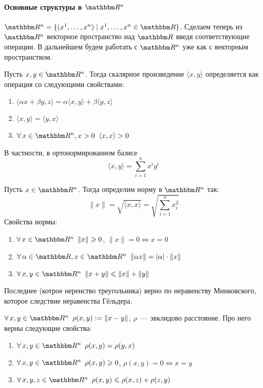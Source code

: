 \documentclass[12pt]{../../notes}
\begin{document}
\paragraph{Основные структуры в \texorpdfstring{$\R^n$}{R\^{}n}}

\begin{defn}\label{defn:Rn}
  $\R^n = \{ (x^1, \dotsc, x^n) \mid x^1, \dotsc, x^n \in \R \}$. Сделаем теперь из $\R^n$ векторное пространство
  над $\R$
  введя соответствующие операции. В дальнейшем будем работать с $\R^n$ уже как с векторным пространством.
\end{defn}

\begin{defn}\label{defn:scalprodRn}
  Пусть $x, y\in \R^n$. Тогда скалярное произведение $\langle x,y\rangle$ определяется как
  операция со следующими свойствами:
  \begin{enumerate}
    \item $\langle \alpha x + \beta y , z \rangle = \alpha \langle x,y\rangle + \beta \langle y,z\rangle$
    \item $\langle x , y \rangle = \langle y, x\rangle$
    \item $\forall\, x \in \R^n, x > 0 \;\; \langle x , x \rangle > 0$
  \end{enumerate}
  В частности, в ортонормированном базисе 
  \[
    \langle x, y \rangle = \sum_{i=1}^{n} x^i y^i
  \]
\end{defn}
\begin{defn}\label{defn:normRn}
  Пусть $x\in \R^n$. Тогда определим норму в $\R^n$ так:
  \[
    \| x \| = \sqrt{\langle x,x \rangle} = \sqrt{\sum_{i=1}^{n} x_i^2}
  \]
  Свойства нормы:
  \begin{enumerate}
    \item $\forall\, x\in \R^n \;\: \| x \| \geqslant 0$, $\|x\| = 0 \Leftrightarrow x = 0$
    \item $\forall\, \alpha\in\R, x\in \R^n \;\; \|\alpha x\| = |\alpha| \cdot \|x\|$
    \item $\forall\, x, y \in \R^n \;\: \|x + y\| \leqslant \|x\| + \|y\|$
  \end{enumerate}
  Последнее (котрое неренство треугольника) верно по неравенству Минковского,
  которое следствие неравенства Гёльдера. 
\end{defn}

\begin{defn}[Метрика в $\R^n$]\label{defn:rhoRn}
  $\forall\, x, y \in \R^n \;\: \rho(x,y) := \| x - y \|$, $\rho$~--- эвклидово расстояние.
  Про него верны следующие свойства:
  \begin{enumerate}
    \item $\forall\, x, y \in \R^n \;\: \rho(x,y) = \rho(y,x)$
    \item $\forall\, x, y \in \R^n \;\:\rho(x,y) \geqslant 0$, $\rho(x,y) = 0 \Leftrightarrow x = y $
    \item $\forall\, x, y, z \in \R^n \;\:\rho(x,y) \leqslant \rho(x,z) + \rho(z,y)$
  \end{enumerate}
\end{defn}
\end{document}
